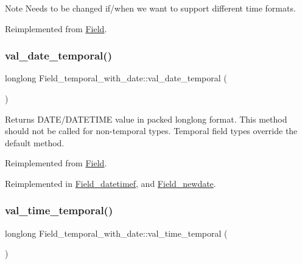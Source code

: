 \begin{DoxyNote}{Note}
Needs to be changed if/when we want to support different time formats. 
\end{DoxyNote}


Reimplemented from \mbox{\hyperlink{classField_a7433aa07355def6c394687567256e6cf}{Field}}.

\mbox{\label{classField__temporal__with__date_a3d1a5e9fb109d1da223753c6072436ab}} 
\subsubsection{\texorpdfstring{val\+\_\+date\+\_\+temporal()}{val\_date\_temporal()}}
{\footnotesize\ttfamily longlong Field\+\_\+temporal\+\_\+with\+\_\+date\+::val\+\_\+date\+\_\+temporal (\begin{DoxyParamCaption}{ }\end{DoxyParamCaption})\hspace{0.3cm}{\ttfamily [virtual]}}

Returns D\+A\+T\+E/\+D\+A\+T\+E\+T\+I\+ME value in packed longlong format. This method should not be called for non-\/temporal types. Temporal field types override the default method. 

Reimplemented from \mbox{\hyperlink{classField_a85b7713df40509aaa467a75eb3945614}{Field}}.



Reimplemented in \mbox{\hyperlink{classField__datetimef_aec7455bda53c84017097539ac92c91d2}{Field\+\_\+datetimef}}, and \mbox{\hyperlink{classField__newdate_a06c3392cc8329a524f544360d789fc3d}{Field\+\_\+newdate}}.

\mbox{\label{classField__temporal__with__date_acf8330ac7e19ae7bdf978fc811e49c00}} 
\subsubsection{\texorpdfstring{val\+\_\+time\+\_\+temporal()}{val\_time\_temporal()}}
{\footnotesize\ttfamily longlong Field\+\_\+temporal\+\_\+with\+\_\+date\+::val\+\_\+time\+\_\+temporal (\begin{DoxyParamCaption}{ }\end{DoxyParamCaption})\hspace{0.3cm}{\ttfamily [virtual]}}

